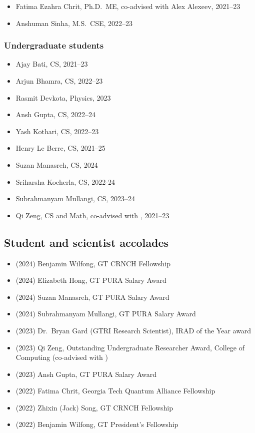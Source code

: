 \begin{itemize}
    \item Fatima Ezahra Chrit, Ph.D.\ ME, co-advised with Alex Alexeev, 2021--23
    \item Anshuman Sinha, M.S.\ CSE, 2022--23
\end{itemize}

\subsubsection{Undergraduate students}

\begin{itemize}
    \item Ajay Bati, CS, 2021--23
    \item Arjun Bhamra, CS, 2022--23
    \item Rasmit Devkota, Physics, 2023
    \item Ansh Gupta, CS, 2022--24
    \item Yash Kothari, CS, 2022--23
    \item Henry Le Berre, CS, 2021--25
    \item Suzan Manasreh, CS, 2024
    \item Sriharsha Kocherla, CS, 2022-24
    \item Subrahmanyam Mullangi, CS, 2023--24
    \item Qi Zeng, CS and Math, co-advised with \Florian, 2021--23
\end{itemize}

\subsection{Student and scientist accolades}

\begin{itemize}
    \item (2024) Benjamin Wilfong, GT CRNCH Fellowship
    \item (2024) Elizabeth Hong, GT PURA Salary Award
    \item (2024) Suzan Manasreh, GT PURA Salary Award
    \item (2024) Subrahmanyam Mullangi, GT PURA Salary Award
    \item (2023) Dr.\ Bryan Gard (GTRI Research Scientist), IRAD of the Year award
    \item (2023) Qi Zeng, Outstanding Undergraduate Researcher Award, College of Computing (co-advised with \Florian)
    \item (2023) Ansh Gupta, GT PURA Salary Award
    \item (2022) Fatima Chrit, Georgia Tech Quantum Alliance Fellowship
    \item (2022) Zhixin (Jack) Song, GT CRNCH Fellowship
    \item (2022) Benjamin Wilfong, GT President's Fellowship
\end{itemize}

